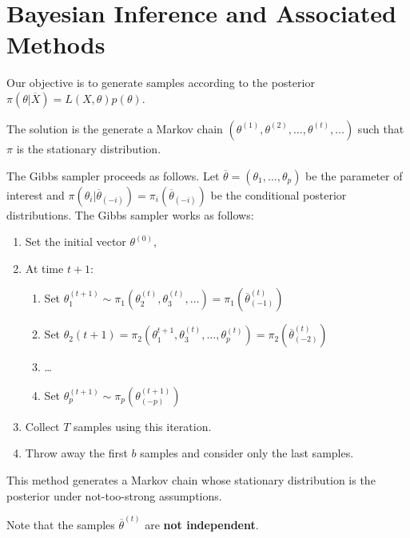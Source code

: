 \section{Bayesian Inference and Associated Methods}
\label{sec:bayes-infer-assoc}

\begin{defn}
  \label{sec:bayes-infer-assoc-1}
  Our objective is to generate samples according to the posterior
  $\pi(\theta | \overline X) = L(X, \theta) p(\theta)$.

  The solution is the generate a Markov chain $(\theta^{(1)},
  \theta^{(2)}, \dots, \theta^{(t)}, \dots)$ such that $\pi$ is the
  stationary distribution.
\end{defn}

\begin{defn}
  \label{sec:bayes-infer-assoc-2}
  The Gibbs sampler proceeds as follows. Let $\overline \theta =
  (\theta_{1}, \dots, \theta_{p})$ be the parameter of interest and
  $\pi(\theta_{i} | \overline \theta_{(-i)}) = \pi_{i}(\overline
  \theta_{(-i)})$ be the conditional posterior distributions. The
  Gibbs sampler works as follows:
  \begin{enumerate}
  \item Set the initial vector $\theta^{(0)}$,
  \item At time $t+1$:
    \begin{enumerate}
    \item Set $\theta_{1}^{(t+1)} \sim \pi_{1}(\theta_{2}^{(t)},
      \theta_{3}^{(t)}, \dots) = \pi_{1}(\overline \theta^{(t)}_{(-1)})$
    \item Set $\theta_{2}(t+1) = \pi_{2}(\theta_{1}^{t+1},
      \theta_{3}^{(t)}, \dots, \theta_{p}^{(t)}) =  \pi_{2}(\overline
      \theta^{(t)}_{(-2)})$
    \item \dots
    \item Set $\theta_{p}^{(t+1)} \sim \pi_{p}(\theta^{(t+1)}_{(-p)})$
    \end{enumerate}
  \item Collect $T$ samples using this iteration.
  \item Throw away the first $b$ samples and consider only the last samples.
  \end{enumerate}

  This method generates a Markov chain whose stationary distribution
  is the posterior under not-too-strong assumptions.

  Note that the samples $\overline \theta^{(t)}$ are \textbf{not independent}.
\end{defn}

